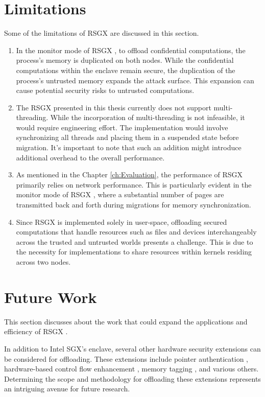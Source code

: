 \documentclass[article, doublespace,nopageskip]{VTthesis} %
\newcommand{\monitor}{RSGX \xspace}
\begin{document}
    \section{Limitations}
    Some of the limitations of \monitor are discussed in this section. 
    
    \begin{enumerate}
        \item In the monitor mode of \monitor, to offload confidential computations, the process's memory is duplicated on both nodes. While the confidential computations within the enclave remain secure, the duplication of the process's untrusted memory expands the attack surface. This expansion can cause potential security risks to untrusted computations.
        \item The \monitor presented in this thesis currently does not support multi-threading. While the incorporation of multi-threading is not infeasible, it would require engineering effort. The implementation would involve synchronizing all threads and placing them in a suspended state before migration. It's important to note that such an addition might introduce additional overhead to the overall performance.
        \item As mentioned in the Chapter \ref{ch:Evaluation}, the performance of \monitor primarily relies on network performance. This is particularly evident in the monitor mode of \monitor, where a substantial number of pages are transmitted back and forth during migrations for memory synchronization.
        \item Since \monitor is implemented solely in user-space, offloading secured computations that handle resources such as files and devices interchangeably across the trusted and untrusted worlds presents a challenge. This is due to the necessity for implementations to share resources within kernels residing across two nodes.
    \end{enumerate}
    
    \section{Future Work}
    This section discusses about the work that could expand the applications and efficiency of \monitor.

    In addition to Intel SGX's enclave, several other hardware security extensions can be considered for offloading. These extensions include pointer authentication \cite{pointer_authentication}, hardware-based control flow enhancement \cite{intel_cet}, memory tagging \cite{arm_mte}, and various others. Determining the scope and methodology for offloading these extensions represents an intriguing avenue for future research.
\end{document}
